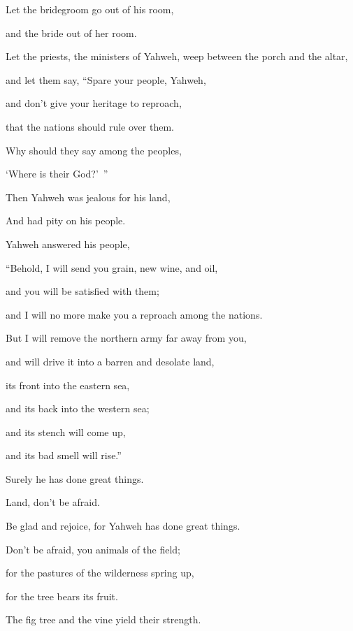 {\par }{\Q Let the bridegroom go out of his room,
\par }{\QB and the bride out of her room.
\par }{\Q {}Let the priests, the ministers of Yahweh, weep between the porch and the altar,
\par }{\QB and let them say, “Spare your people, Yahweh,
\par }{\QB and don’t give your heritage to reproach,
\par }{\QB that the nations should rule over them.
\par }{\Q Why should they say among the peoples,
\par }{\QB ‘Where is their God?’ ”
\par }{\Q {}Then Yahweh was jealous for his land,
\par }{\QB And had pity on his people.
\par }{\Q {}Yahweh answered his people,
\par }{\QB “Behold, I will send you grain, new wine, and oil,
\par }{\QB and you will be satisfied with them;
\par }{\QB and I will no more make you a reproach among the nations.
\par }{\Q {}But I will remove the northern army far away from you,
\par }{\QB and will drive it into a barren and desolate land,
\par }{\QB its front into the eastern sea,
\par }{\QB and its back into the western sea;
\par }{\QB and its stench will come up,
\par }{\QB and its bad smell will rise.”
\par }{\Q Surely he has done great things.
\par }{\Q {}Land, don’t be afraid.
\par }{\QB Be glad and rejoice, for Yahweh has done great things.
\par }{\Q {}Don’t be afraid, you animals of the field;
\par }{\QB for the pastures of the wilderness spring up,
\par }{\QB for the tree bears its fruit.
\par }{\QB The fig tree and the vine yield their strength.
}

